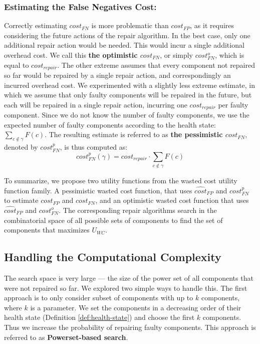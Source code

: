 \documentclass[letterpaper]{article}
\begin{document}
\subsubsection{Estimating the False Negatives Cost:}
Correctly estimating $cost_{FN}$ is more problematic than $cost_{FP}$, as it requires considering the future actions of the repair algorithm.
In the best case, only one additional repair action would be needed. This would incur a single additional overhead cost. We call this {\bf the optimistic $cost_{FN}$}, or simply $cost_{FN}^o$, which is equal to $cost_{repair}$.
The other extreme assumes that every component not repaired so far would be repaired by a single repair action, and correspondingly an incurred overhead cost. We experimented with a slightly less extreme estimate, in which we assume that only faulty components will be repaired in the future, but each will be repaired in a single repair action, incurring one $cost_{repair}$ per faulty component.
Since we do not know the number of faulty components, we use the expected number of faulty components according to the health state: $\sum_{c\notin \gamma} F(c)$. The resulting estimate is referred to as {\bf the pessimistic $cost_{FN}$}, denoted by $cost_{FN}^p$, is thus computed as:
\[ cost_{FN}^p(\gamma)=cost_{repair}\cdot \sum_{c\notin \gamma} F(c)\]


To summarize, we propose two utility functions from the wasted cost utility function family. A pessimistic wasted cost function, that uses $\widehat{cost}_{FP}$ and $cost_{FN}^p$ to estimate $cost_{FP}$ and $cost_{FN}$, and an optimistic wasted cost function that uses $\widehat{cost}_{FP}$ and $cost_{FN}^o$. The corresponding repair algorithms search in the combinatorial space of all possible sets of components to find the set of components that maximizes $U_{WC}$.


\subsection{Handling the Computational Complexity}
The search space is very large --- the size of the power set of all components that were not repaired so far.
We explored two simple ways to handle this. The first approach is to only consider subset of components with up to $k$ components, where $k$ is a parameter. We set the components in a decreasing order of their health state (Definition \ref{def:health-state}) and choose the first $k$ components. Thus we increase the probability of repairing faulty components. This approach is referred to as {\bf Powerset-based search}.
\end{document}
